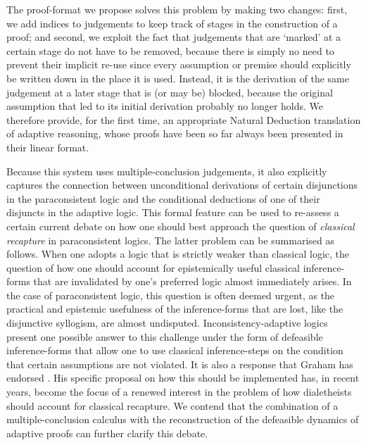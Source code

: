 \documentclass[]{article}
\begin{document}
The proof-format we propose solves this problem by making two changes: first, we add indices to judgements to keep track of stages in the construction of a proof; and second, we exploit the fact that judgements that are `marked' at a certain stage do not have to be removed, because there is simply no need to prevent their implicit re-use since every assumption or premise should explicitly be written down in the place it is used. Instead, it is the derivation of the same judgement at a later stage that is (or may be) blocked, because the original assumption that led to its initial derivation probably no longer holds. We therefore provide, for the first time, an appropriate Natural Deduction translation of adaptive reasoning, whose proofs have been so far always been presented in their linear format.

Because this system uses multiple-conclusion judgements, it also explicitly captures the connection between unconditional derivations of certain disjunctions in the paraconsistent logic and the conditional deductions of one of their disjuncts in the adaptive logic. This formal feature can be used to re-assess a certain current debate on how one should best approach the question of \textit{classical recapture} in paraconsistent logics. The latter problem can be summarised as follows. When one adopts a logic that is strictly weaker than classical logic, the question of how one should account for epistemically useful classical inference-forms that are invalidated by one's preferred logic almost immediately arises. In the case of paraconsistent logic, this question is often deemed urgent, as the practical and epistemic usefulness of the inference-forms that are lost, like the disjunctive syllogism, are almost undisputed. Inconsistency-adaptive logics present one possible answer to this challenge under the form of defeasible inference-forms that allow one to use classical inference-steps on the condition that certain assumptions are not violated. It is also a response that Graham has endorsed \cite{GP:LPm}. His specific proposal on how this should be implemented has, in recent years, become the focus of a renewed interest in the problem of how dialetheists should account for classical recapture. We contend that the combination of a multiple-conclusion calculus with the reconstruction of the defeasible dynamics of adaptive proofs can further clarify this debate.
\end{document}
